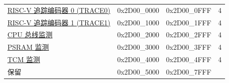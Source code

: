 \begin{ThreePartTable}
\begin{longtable}[c]{ |p{7cm}|c|c|r| }
        \rowcolor{lightgray}\multicolumn{4}{|l|}{\textbf{调试外设}}\\\hline
    \hyperref[mod:riscvtracenc]{RISC-V 追踪编码器 0 (TRACE0)} & 0x2D00\_0000 & 0x2D00\_0FFF &   4\\\hline
    \hyperref[mod:riscvtracenc]{RISC-V 追踪编码器 1 (TRACE1)} & 0x2D00\_1000 & 0x2D00\_1FFF &   4\\\hline
    \hyperref[mod:dbgassist]{CPU 总线监测} & 0x2D00\_2000 & 0x2D00\_2FFF &   4\\\hline
    \hyperref[mod:dbgassist]{PSRAM 监测} & 0x2D00\_3000 & 0x2D00\_3FFF &   4\\\hline
    \hyperref[mod:dbgassist]{TCM 监测} & 0x2D00\_4000 & 0x2D00\_4FFF &   4\\\hline
        \rowcolor{gray!25}  保留          & 0x2D00\_5000 & 0x2D00\_7FFF &    \\\hline
        
    \end{longtable}
    \end{ThreePartTable}
    